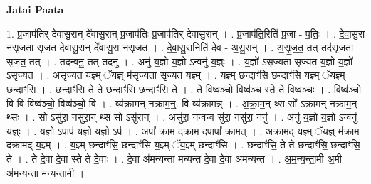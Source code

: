 \documentclass[17pt]{extarticle}
\begin{document}
\textbf{Jatai Paata} \newline

1. प्र॒जाप॑तिर् देवासु॒रान् दे॑वासु॒रान् प्र॒जाप॑तिः प्र॒जाप॑तिर् देवासु॒रान् । . प्र॒जाप॑ति॒रिति॑ प्र॒जा - प॒तिः॒ । . दे॒वा॒सु॒रा न॑सृजता सृजत देवासु॒रान् दे॑वासु॒रा न॑सृजत । . दे॒वा॒सु॒रानिति॑ देव - अ॒सु॒रान् । . अ॒सृ॒ज॒त॒ तत् तद॑सृजता सृजत॒ तत् । . तदन्वनु॒ तत् तदनु॑ । . अनु॑ य॒ज्ञो य॒ज्ञो ऽन्वनु॑ य॒ज्ञ्ः । . य॒ज्ञो॑ ऽसृज्यता सृज्यत य॒ज्ञो य॒ज्ञो॑ ऽसृज्यत । . अ॒सृ॒ज्य॒त॒ य॒ज्ञ्म् ॅय॒ज्ञ् म॑सृज्यता सृज्यत य॒ज्ञ्म् । . य॒ज्ञ्म् छन्दाꣳ॑सि॒ छन्दाꣳ॑सि य॒ज्ञ्म् ॅय॒ज्ञ्म् छन्दाꣳ॑सि । . छन्दाꣳ॑सि॒ ते ते छन्दाꣳ॑सि॒ छन्दाꣳ॑सि॒ ते । . ते विष्व॑ञ्चो॒ विष्व॑ञ्च॒ स्ते ते विष्व॑ञ्चः । . विष्व॑ञ्चो॒ वि वि विष्व॑ञ्चो॒ विष्व॑ञ्चो॒ वि । . व्य॑क्रामन् नक्राम॒न्॒. वि व्य॑क्रामन्न् । . अ॒क्रा॒म॒न् थ्स सो᳚ ऽक्रामन् नक्राम॒न् थ्सः । . सो ऽसु॑रा॒ नसु॑रा॒न् थ्स सो ऽसु॑रान् । . असु॑रा॒ नन्वन्व सु॑रा॒ नसु॑रा॒ ननु॑ । . अनु॑ य॒ज्ञो य॒ज्ञो ऽन्वनु॑ य॒ज्ञ्ः । . य॒ज्ञो ऽपाप॑ य॒ज्ञो य॒ज्ञो ऽप॑ । . अपा᳚ क्राम दक्राम॒ दपापा᳚ क्रामत् । . अ॒क्रा॒म॒द् य॒ज्ञ्म् ॅय॒ज्ञ् म॑क्राम दक्रामद् य॒ज्ञ्म् । . य॒ज्ञ्म् छन्दाꣳ॑सि॒ छन्दाꣳ॑सि य॒ज्ञ्म् ॅय॒ज्ञ्म् छन्दाꣳ॑सि । . छन्दाꣳ॑सि॒ ते ते छन्दाꣳ॑सि॒ छन्दाꣳ॑सि॒ ते । . ते दे॒वा दे॒वा स्ते ते दे॒वाः । . दे॒वा अ॑मन्यन्ता मन्यन्त दे॒वा दे॒वा अ॑मन्यन्त । . अ॒म॒न्य॒न्ता॒मी अ॒मी अ॑मन्यन्ता मन्यन्ता॒मी । \newline
\end{document}

